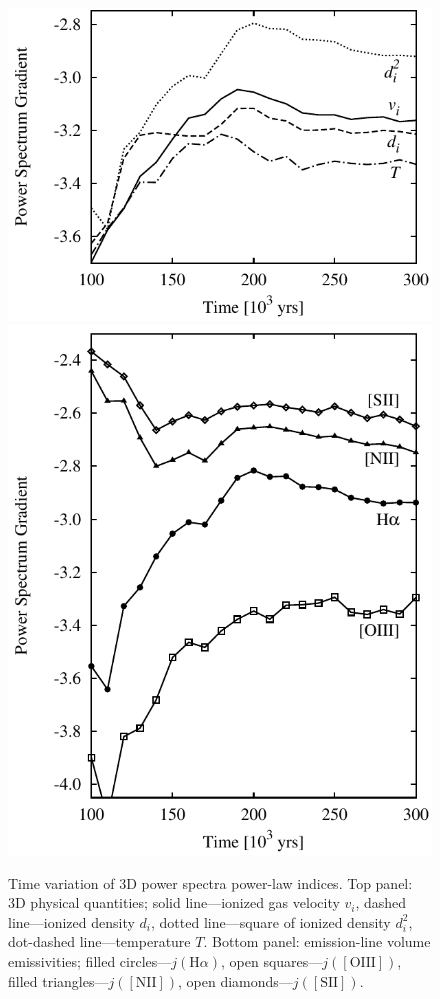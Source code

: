\documentclass[useAMS,usenatbib]{mn2e}
\begin{document}
\begin{figure}
\centering
\includegraphics[width=\linewidth]{afkz1}\\
\includegraphics[width=\linewidth]{ef1kmp}
\caption{Time variation of 3D power spectra power-law indices. Top panel: 3D physical
  quantities; solid line---ionized
  gas velocity $v_i$, dashed line---ionized density $d_i$, dotted line---square of ionized density $d_i^2$,
  dot-dashed line---temperature $T$. Bottom panel: emission-line
  volume emissivities; filled circles---$j(\mathrm{H}\alpha)$, open
  squares---$j(\mathrm{[OIII]})$, filled
  triangles---$j(\mathrm{[NII]})$, open diamonds---$j(\mathrm{[SII]})$.}
\label{fig:psevol}
\end{figure}
\end{document}
